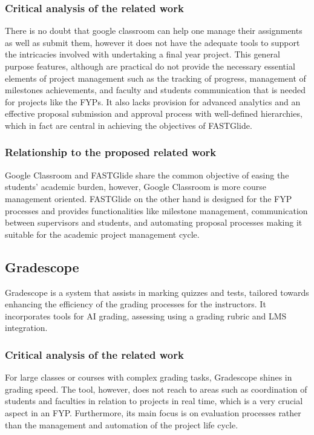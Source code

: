 \documentclass{FastFyp}
\begin{document}
\subsubsection{Critical analysis of the related work}
There is no doubt that google classroom can help one manage their assignments as well as submit them, however it does not have the adequate tools to support the intricacies involved with undertaking a final year project. This general purpose features, although are practical do not provide the necessary essential elements of project management such as the tracking of progress, management of milestones achievements, and faculty and students communication that is needed for projects like the FYPs. It also lacks provision for advanced analytics and an effective proposal submission and approval process with well-defined hierarchies, which in fact are central in achieving the objectives of FASTGlide.
\subsubsection{Relationship to the proposed related work}
Google Classroom and FASTGlide share the common objective of easing the students’ academic burden, however, Google Classroom is more course management oriented. FASTGlide on the other hand is designed for the FYP processes and provides functionalities like milestone management, communication between supervisors and students, and automating proposal processes making it suitable for the academic project management cycle.
\subsection{Gradescope}
Gradescope \cite{ref:gradescope} is a system that assists in marking quizzes and tests, tailored towards enhancing the efficiency of the grading processes for the instructors. It incorporates tools for AI grading, assessing using a grading rubric and LMS integration.
\subsubsection{Critical analysis of the related work}
For large classes or courses with complex grading tasks, Gradescope shines in grading speed. The tool, however, does not reach to areas such as coordination of students and faculties in relation to projects in real time, which is a very crucial aspect in an FYP. Furthermore, its main focus is on evaluation processes rather than the management and automation of the project life cycle.
\end{document}
